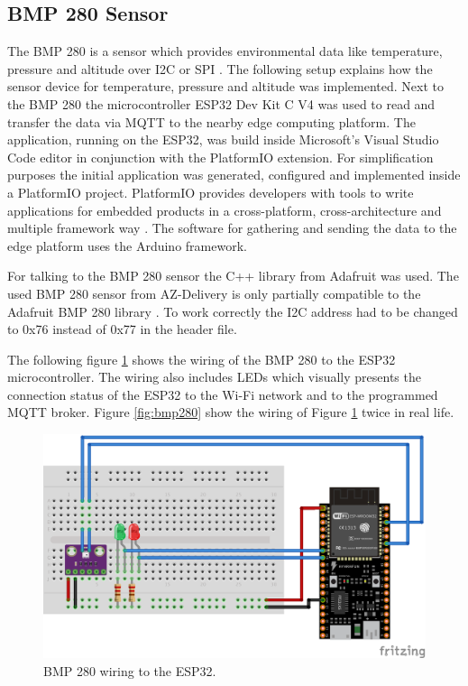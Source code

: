 \subsection{BMP 280 Sensor}\label{subsec:bmp280}
The BMP 280 is a sensor which provides environmental data like temperature, pressure and altitude over I2C or SPI \cite{Az-delivery-BMP280}. The following setup explains how the sensor device for temperature, pressure and altitude was implemented. Next to the BMP 280 the microcontroller ESP32 Dev Kit C V4 was used to read and transfer the data via MQTT to the nearby edge computing platform. The application, running on the ESP32, was build inside Microsoft’s Visual Studio Code editor in conjunction with the PlatformIO extension. For simplification purposes the initial application was generated, configured and implemented inside a PlatformIO project. PlatformIO provides developers with tools to write applications for embedded products in a cross-platform, cross-architecture and multiple framework way \cite{Platformio}. The software for gathering and sending the data to the edge platform uses the Arduino framework. 

\bigskip
For talking to the BMP 280 sensor the C++ library from Adafruit \cite{Adafruit} was used. The used BMP 280 sensor from AZ-Delivery is only partially compatible to the Adafruit BMP 280 library \cite{Az-delivery-BMP280}. To work correctly the I2C address had to be changed to 0x76 instead of 0x77 in the header file.
 
\bigskip
The following figure \ref{fig:wiring-bmp280} shows the wiring of the BMP 280 to the ESP32 microcontroller. The wiring also includes LEDs which visually presents the connection status of the ESP32 to the Wi-Fi network and to the programmed MQTT broker. Figure \ref{fig:bmp280} show the wiring of Figure \ref{fig:wiring-bmp280} twice in real life.

\begin{figure}[H]
    \centering
    \includegraphics[width=\textwidth]{assets/setup/wiring-bmp280.png}
    \caption{BMP 280 wiring to the ESP32.}\label{fig:wiring-bmp280}
\end{figure}

